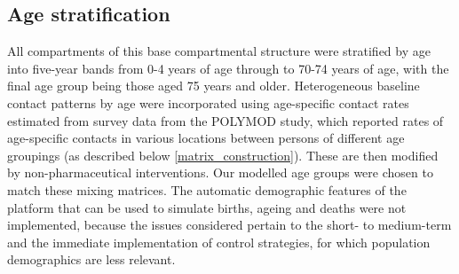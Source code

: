 \subsection{Age stratification}
All compartments of this base compartmental structure were stratified by age into five-year bands from 0-4 years of age through to 70-74 years of age, with the final age group being those aged 75 years and older. Heterogeneous baseline contact patterns by age were incorporated using age-specific contact rates estimated from survey data from the POLYMOD study, which reported rates of age-specific contacts in various locations between persons of different age groupings (as described below \ref{matrix_construction}). These are then modified by non-pharmaceutical interventions. Our modelled age groups were chosen to match these mixing matrices. The automatic demographic features of the platform that can be used to simulate births, ageing and deaths were not implemented, because the issues considered pertain to the short- to medium-term and the immediate implementation of control strategies, for which population demographics are less relevant.
